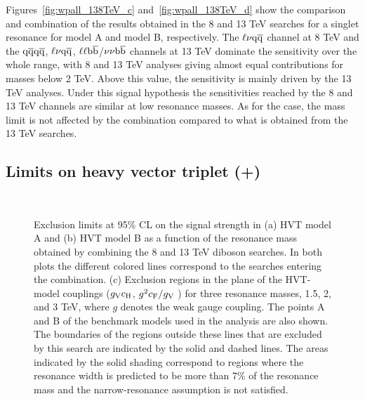 Figures~\ref{fig:wpall_138TeV_c} and~\ref{fig:wpall_138TeV_d} show the comparison and combination of the results obtained in the 8 and 13 TeV searches for a \Zpr singlet resonance for model A and model B, respectively.
The $\ell \nu \mathrm{q}\overline{\mathrm{q}}$ channel at 8 TeV and the $\mathrm{q}\overline{\mathrm{q}} \mathrm{q}\overline{\mathrm{q}}$, $\ell \nu \mathrm{q}\overline{\mathrm{q}}$, $\ell\ell{\mathrm{b}\overline{\mathrm{b}}}$/$\nu\nu{\mathrm{b}\overline{\mathrm{b}}}$ channels at 13 TeV dominate the sensitivity over the whole range, with 8 and 13 TeV analyses giving almost equal contributions for masses below 2 TeV. Above this value, the sensitivity is mainly driven by the 13 TeV analyses.
Under this signal hypothesis the sensitivities reached by the 8 and 13 TeV channels are similar at low resonance masses. %
As for the \Wpr case, the mass limit is not affected by the combination compared to what is obtained from the 13 TeV searches.

\subsection{Limits on heavy vector triplet (\Wpr+\Zpr)}\label{subsec:comboHVT}

\begin{figure}[!htb]
\centering
{}
\\
\caption{
Exclusion limits at 95\% CL on the signal strength in (a) HVT model A and (b) HVT model B as a function of the resonance mass obtained by combining the 8 and 13 TeV diboson searches. In both plots the different colored lines correspond to the searches entering the combination.
(c) Exclusion regions in the plane of the HVT-model couplings ($g_{\rm V}c_{\rm H}$, $g^2c_{\rm F}/g_{\rm V}$ ) for three resonance masses, 1.5, 2, and 3 TeV, where $g$ denotes the weak gauge coupling. The points A and B of the benchmark models used in the analysis are also shown.
The boundaries of the regions outside these lines that are excluded by this search are indicated by the solid and dashed lines.
The areas indicated by the solid shading correspond to regions where the resonance width is predicted to be more than 7\% of the resonance mass and the narrow-resonance assumption is not satisfied.
}
\label{fig:hvtall_138TeV}
\end{figure}

